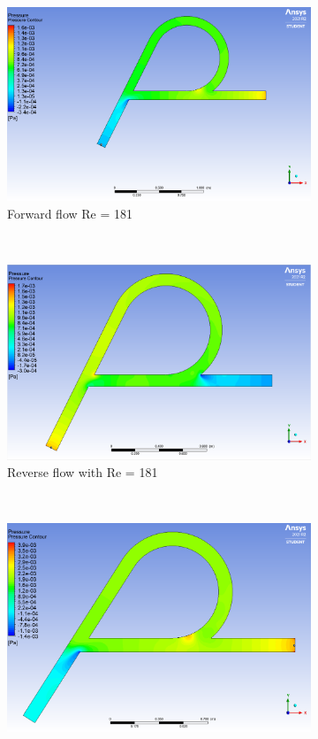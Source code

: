 \begin{figure}[H]
 \centering
\begin{subfigure}{.45\textwidth}
  \centering
  \includegraphics[width=.9\linewidth]{images/task2/L600/forward181.png}
  \caption{Forward flow Re = 181}
  \label{fig:x_d_norm}
\end{subfigure}%
~
\begin{subfigure}{.45\textwidth}
  \centering
  \includegraphics[width=.9\linewidth]{images/task2/L600/reverse181.png}
  \caption{Reverse flow with Re = 181}
  \label{fig:x_d_norm_actual}
\end{subfigure}
~
\begin{subfigure}{.45\textwidth}
  \centering
  \includegraphics[width=.9\linewidth]{images/task2/L600/forward362.png}

\end{subfigure}
\end{figure}
